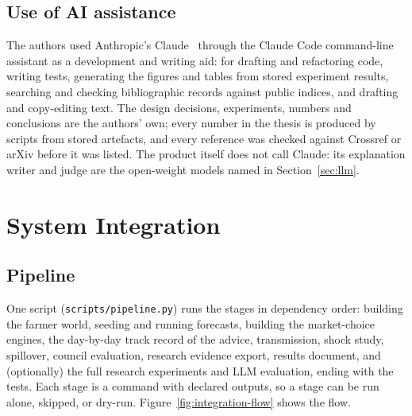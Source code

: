 \subsection{Use of AI assistance}
\label{sec:ai-disclosure}
The authors used Anthropic's Claude~\cite{claude3} through the Claude Code command-line assistant as a development and writing aid: for drafting and refactoring code, writing tests, generating the figures and tables from stored experiment results, searching and checking bibliographic records against public indices, and drafting and copy-editing text. The design decisions, experiments, numbers and conclusions are the authors' own; every number in the thesis is produced by scripts from stored artefacts, and every reference was checked against Crossref or arXiv before it was listed. The product itself does not call Claude: its explanation writer and judge are the open-weight models named in Section~\ref{sec:llm}.

\section{System Integration}
\label{sec:system-integration}

\subsection{Pipeline}

One script (\texttt{scripts/pipeline.py}) runs the stages in dependency order: building the farmer world, seeding and running forecasts, building the market-choice engines, the day-by-day track record of the advice, transmission, shock study, spillover, council evaluation, research evidence export, results document, and (optionally) the full research experiments and LLM evaluation, ending with the tests. Each stage is a command with declared outputs, so a stage can be run alone, skipped, or dry-run. Figure~\ref{fig:integration-flow} shows the flow.

